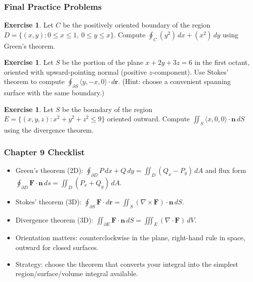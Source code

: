 \documentclass[12pt]{article}
\numberwithin{equation}{section}
\newcommand{\vect}[1]{\boldsymbol{#1}}   %
\theoremstyle{plain}
\theoremstyle{definition}
\newtheorem{exercise}[theorem]{Exercise}
\theoremstyle{remark}
\begin{document}
\subsubsection{Final Practice Problems}

\begin{exercise}
Let $C$ be the positively oriented boundary of the region $D=\{(x,y):0\le x\le 1,\ 0\le y\le x\}$.
Compute $\displaystyle \oint_C (y^2)\,dx + (x^2)\,dy$ using Green's theorem.
\end{exercise}

\begin{exercise}
Let $S$ be the portion of the plane $x+2y+3z=6$ in the first octant, oriented with upward-pointing normal (positive $z$-component).
Use Stokes' theorem to compute $\displaystyle \oint_{\partial S} \langle y,-x,0\rangle\cdot d\vect r$.
(Hint: choose a convenient spanning surface with the same boundary.)
\end{exercise}

\begin{exercise}
Let $S$ be the boundary of the region $E=\{(x,y,z):x^2+y^2+z^2\le 9\}$ oriented outward.
Compute $\displaystyle \iint_S \langle x,0,0\rangle\cdot \vect n\,dS$ using the divergence theorem.
\end{exercise}

\subsubsection*{Chapter 9 Checklist}
\begin{itemize}
\item Green's theorem (2D): $\displaystyle \oint_{\partial D} P\,dx+Q\,dy=\iint_D (Q_x-P_y)\,dA$ and flux form $\displaystyle \oint_{\partial D} \vect F\cdot \vect n\,ds=\iint_D (P_x+Q_y)\,dA$.
\item Stokes' theorem (3D): $\displaystyle \oint_{\partial S}\vect F\cdot d\vect r=\iint_S (\nabla\times\vect F)\cdot \vect n\,dS$.
\item Divergence theorem (3D): $\displaystyle \iint_{\partial E}\vect F\cdot \vect n\,dS=\iiint_E (\nabla\cdot\vect F)\,dV$.
\item Orientation matters: counterclockwise in the plane, right-hand rule in space, outward for closed surfaces.
\item Strategy: choose the theorem that converts your integral into the simplest region/surface/volume integral available.
\end{itemize}

\end{document}
